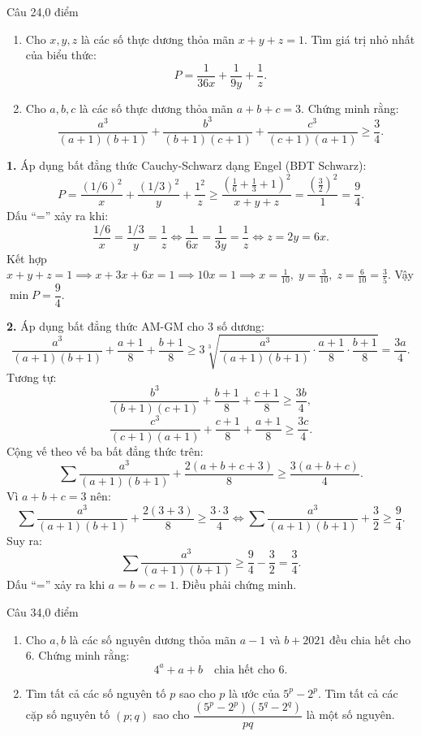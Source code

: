 \begin{de_cau}{Câu 2}{4,0 điểm}
\begin{enumerate}[label=\arabic*.]
\item Cho $x, y, z$ là các số thực dương thỏa mãn $x+y+z = 1$. Tìm giá trị nhỏ nhất của biểu thức:
\[P = \dfrac{1}{36x} + \dfrac{1}{9y} + \dfrac{1}{z}.\]
\item Cho $a, b, c$ là các số thực dương thỏa mãn $a+b+c = 3$. Chứng minh rằng:
\[\dfrac{a^3}{(a+1)(b+1)} + \dfrac{b^3}{(b+1)(c+1)} + \dfrac{c^3}{(c+1)(a+1)} \ge \dfrac{3}{4}.\]
\end{enumerate}
\end{de_cau}

\begin{loi_giai_cau}
\textbf{1.} Áp dụng bất đẳng thức Cauchy-Schwarz dạng Engel (BĐT Schwarz):
\[P = \frac{(1/6)^2}{x} + \frac{(1/3)^2}{y} + \frac{1^2}{z} \ge \frac{\left(\frac{1}{6} + \frac{1}{3} + 1\right)^2}{x+y+z} = \frac{\left(\frac{3}{2}\right)^2}{1} = \frac{9}{4}.\]
Dấu ``='' xảy ra khi:
\[\frac{1/6}{x} = \frac{1/3}{y} = \frac{1}{z} \iff \frac{1}{6x} = \frac{1}{3y} = \frac{1}{z} \iff z = 2y = 6x.\]
Kết hợp $x + y + z = 1 \implies x + 3x + 6x = 1 \implies 10x = 1 \implies x = \frac{1}{10},\; y = \frac{3}{10},\; z = \frac{6}{10} = \frac{3}{5}$.
Vậy $\min P = \boxed{\dfrac{9}{4}}$.

\textbf{2.} Áp dụng bất đẳng thức AM-GM cho 3 số dương:
\[\frac{a^3}{(a+1)(b+1)} + \frac{a+1}{8} + \frac{b+1}{8} \ge 3 \sqrt[3]{\frac{a^3}{(a+1)(b+1)} \cdot \frac{a+1}{8} \cdot \frac{b+1}{8}} = \frac{3a}{4}.\]
Tương tự:
\[\frac{b^3}{(b+1)(c+1)} + \frac{b+1}{8} + \frac{c+1}{8} \ge \frac{3b}{4},\]
\[\frac{c^3}{(c+1)(a+1)} + \frac{c+1}{8} + \frac{a+1}{8} \ge \frac{3c}{4}.\]
Cộng vế theo vế ba bất đẳng thức trên:
\[\sum \frac{a^3}{(a+1)(b+1)} + \frac{2(a+b+c+3)}{8} \ge \frac{3(a+b+c)}{4}.\]
Vì $a+b+c = 3$ nên:
\[\sum \frac{a^3}{(a+1)(b+1)} + \frac{2(3+3)}{8} \ge \frac{3 \cdot 3}{4} \iff \sum \frac{a^3}{(a+1)(b+1)} + \frac{3}{2} \ge \frac{9}{4}.\]
Suy ra:
\[\sum \frac{a^3}{(a+1)(b+1)} \ge \frac{9}{4} - \frac{3}{2} = \boxed{\frac{3}{4}}.\]
Dấu ``='' xảy ra khi $a = b = c = 1$. Điều phải chứng minh.
\end{loi_giai_cau}

\begin{de_cau}{Câu 3}{4,0 điểm}
\begin{enumerate}[label=\arabic*.]
\item Cho $a, b$ là các số nguyên dương thỏa mãn $a-1$ và $b+2021$ đều chia hết cho $6$. Chứng minh rằng:
\[4^a + a + b \quad \text{chia hết cho } 6.\]
\item Tìm tất cả các số nguyên tố $p$ sao cho $p$ là ước của $5^p - 2^p$. Tìm tất cả các cặp số nguyên tố $(p; q)$ sao cho $\dfrac{(5^p-2^p)(5^q-2^q)}{pq}$ là một số nguyên.
\end{enumerate}
\end{de_cau}

